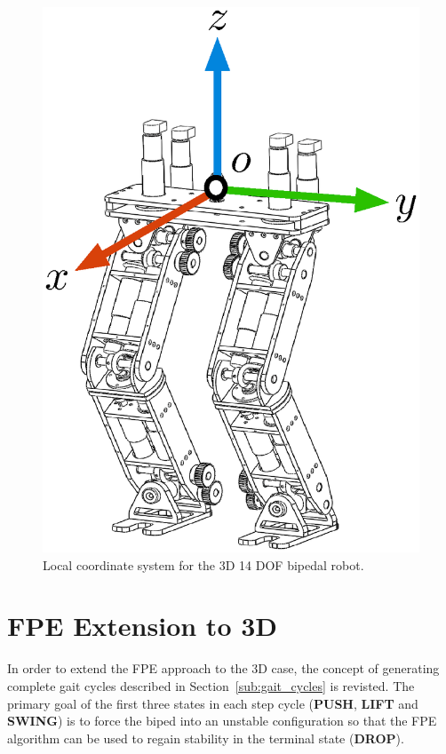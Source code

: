 \begin{figure}[!h]
	\centering
    \includegraphics[trim = 0mm 13mm 0mm 0mm,clip,scale=0.7]{fig/fpe/aslbiped.eps} 
  	\caption{Local coordinate system for the 3D 14 DOF bipedal robot.}
	\label{fig:bipedcoord}
\end{figure}


\section{FPE Extension to 3D} %
\label{sec:extension_to_3d}

In order to extend the FPE approach to the 3D case, the concept of generating complete gait cycles described in Section~\ref{sub:gait_cycles} is revisted. The primary goal of the first three states in each step cycle (\textbf{PUSH}, \textbf{LIFT} and \textbf{SWING}) is to force the biped into an unstable configuration so that the FPE algorithm can be used to regain stability in the terminal state (\textbf{DROP}).

